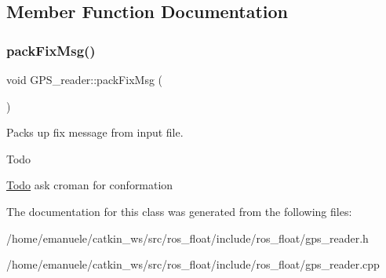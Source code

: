 \subsection{Member Function Documentation}
\mbox{\label{classGPS__reader_a548d1980ea97af075804d34638af3a26}} 
\subsubsection{\texorpdfstring{pack\+Fix\+Msg()}{packFixMsg()}}
{\footnotesize\ttfamily void G\+P\+S\+\_\+reader\+::pack\+Fix\+Msg (\begin{DoxyParamCaption}{ }\end{DoxyParamCaption})\hspace{0.3cm}{\ttfamily [private]}}



Packs up fix message from input file. 

\begin{DoxyRefDesc}{Todo}
\item[\hyperlink{todo__todo000001}{Todo}]ask croman for conformation \end{DoxyRefDesc}


The documentation for this class was generated from the following files\+:\begin{DoxyCompactItemize}
\item 
/home/emanuele/catkin\+\_\+ws/src/ros\+\_\+float/include/ros\+\_\+float/gps\+\_\+reader.\+h\item 
/home/emanuele/catkin\+\_\+ws/src/ros\+\_\+float/include/ros\+\_\+float/gps\+\_\+reader.\+cpp\end{DoxyCompactItemize}
